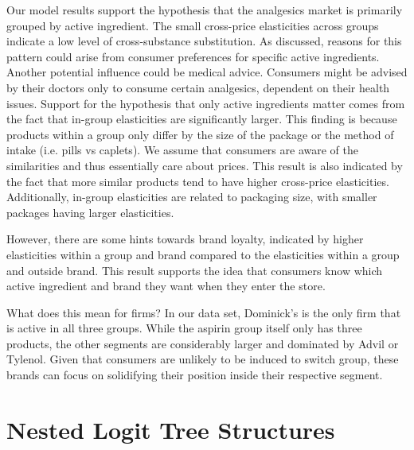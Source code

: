 \documentclass[12pt, authoryear]{elsarticle}
\begin{document}
Our model results support the hypothesis that the analgesics market is primarily grouped by active ingredient. The small cross-price elasticities across groups indicate a low level of cross-substance substitution. As discussed, reasons for this pattern could arise from consumer preferences for specific active ingredients. Another potential influence could be medical advice. Consumers might be advised by their doctors only to consume certain analgesics, dependent on their health issues. Support for the hypothesis that only active ingredients matter comes from the fact that in-group elasticities are significantly larger. This finding is because products within a group only differ by the size of the package or the method of intake (i.e. pills vs caplets). We assume that consumers are aware of the similarities and thus essentially care about prices. This result is also indicated by the fact that more similar products tend to have higher cross-price elasticities. Additionally, in-group elasticities are related to packaging size, with smaller packages having larger elasticities. 

However, there are some hints towards brand loyalty, indicated by higher elasticities within a group and brand compared to the elasticities within a group and outside brand. This result supports the idea that consumers know which active ingredient and brand they want when they enter the store.

What does this mean for firms? In our data set, Dominick’s is the only firm that is active in all three groups. While the aspirin group itself only has three products, the other segments are considerably larger and dominated by Advil or Tylenol. Given that consumers are unlikely to be induced to switch group, these brands can focus on solidifying their position inside their respective segment. 

\pagebreak



\appendix
\setcounter{figure}{0}

\section{ Nested Logit Tree Structures}
\end{document}
